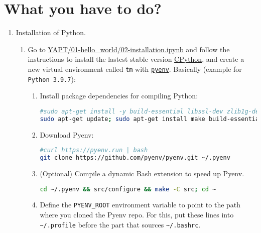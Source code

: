 \section{What you have to do?}

\begin{enumerate}
  
\item Installation of Python.
  
  \begin{enumerate}
    
  \item Go to
    \href{https://github.com/vicente-gonzalez-ruiz/YAPT/blob/master/01-hello_world/02-installation.ipynb}{YAPT/01-hello\_world/02-installation.ipynb}
    \cite{YAPT} and follow the instructions to install the lastest
    stable version
    \href{https://en.wikipedia.org/wiki/CPython}{CPython}, and create
    a new virtual environment called \texttt{tm} with
    \href{https://github.com/pyenv/pyenv}{\texttt{pyenv}}. Basically
    (example for \verb|Python 3.9.7|):

    \begin{enumerate}
      \item Install package dependencies for compiling Python:

        \begin{lstlisting}[mathescape=false, language=Bash]
#sudo apt-get install -y build-essential libssl-dev zlib1g-dev libbz2-dev libreadline-dev libsqlite3-dev wget curl llvm libncurses5-dev libncursesw5-dev xz-utils tk-dev libffi-dev liblzma-dev git
sudo apt-get update; sudo apt-get install make build-essential libssl-dev zlib1g-dev libbz2-dev libreadline-dev libsqlite3-dev wget curl llvm libncursesw5-dev xz-utils tk-dev libxml2-dev libxmlsec1-dev libffi-dev liblzma-dev
        \end{lstlisting}

        \item Download Pyenv:
        \begin{lstlisting}[mathescape=false, language=Bash]
#curl https://pyenv.run | bash
git clone https://github.com/pyenv/pyenv.git ~/.pyenv
        \end{lstlisting}
        
      \item (Optional) Compile a dynamic Bash extension to speed up
        Pyenv.
        \begin{lstlisting}[mathescape=false, language=Bash]
cd ~/.pyenv && src/configure && make -C src; cd ~
        \end{lstlisting}
      \item Define the \verb|PYENV_ROOT| environment variable to point
        to the path where you cloned the Pyenv repo. For this, put
        these lines into \verb|~/.profile| before the part that sources
        \verb|~/.bashrc|.
        

\end{enumerate}
\end{enumerate}
\end{enumerate}
